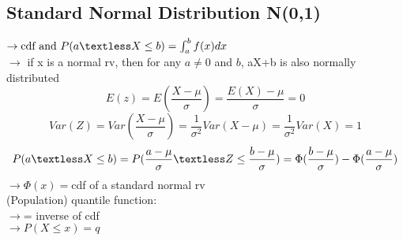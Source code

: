\documentclass{article}
\begin{document}
\subsection{Standard Normal Distribution N(0,1)}
$\rightarrow \text{cdf and } P(a \textless X \leq b) = \int_a^b f(x)dx$\\
$\rightarrow$ if x is a normal rv, then for any $a\neq0$ and $b$, aX+b is also normally distributed\\
\[E(z) = E(\frac{X-\mu}{\sigma}) = \frac{E(X)-\mu}{\sigma} = 0\]
\[Var(Z) = Var(\frac{X-\mu}{\sigma}) = \frac{1}{\sigma^2}Var(X-\mu) = \frac{1}{\sigma^2}Var(X)=1\]
\[P(a \textless X \leq b) = P(\frac{a-\mu}{\sigma} \textless Z \leq \frac{b-\mu}{\sigma}) = \Phi(\frac{b-\mu}{\sigma})- \Phi(\frac{a-\mu}{\sigma})\]
$\rightarrow \Phi(x)=$cdf of a standard normal rv\\
(Population) quantile function:\\
$\rightarrow$= inverse of cdf\\
$\rightarrow P(X \leq x) =q$
\end{document}
